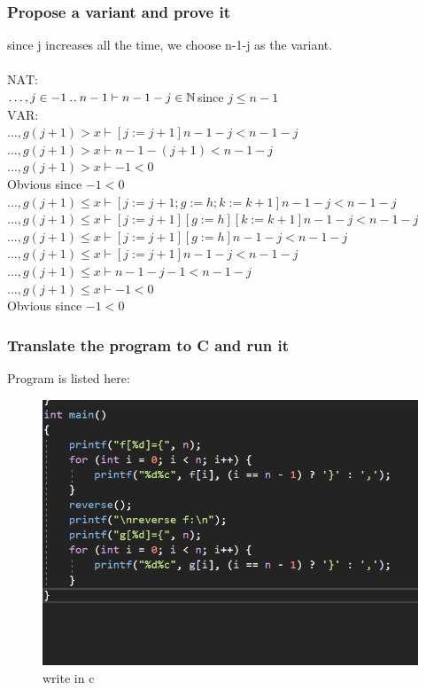 \documentclass[11pt,a4paper,fleqn]{article}
\begin{document}
\subsubsection{Propose a variant and prove it}
\noindent
since j increases all the time, we choose n-1-j as the variant.\\ 
\\
$\text{NAT:}$\\
$ \ldots,j\in -1\mathbin{.\mkern1mu.} n-1\vdash n-1-j\in \mathbb{N}$\quad since $j\leq n-1$\\
$\text{VAR:}$\\
$ \ldots,g(j+1)>x\vdash[j:=j+1]n-1-j<n-1-j$\\
$ \ldots,g(j+1)>x\vdash n-1-(j+1)<n-1-j$\\
$ \ldots,g(j+1)>x\vdash -1<0$\\
Obvious since $-1<0$\\
$ \ldots,g(j+1)\leq x\vdash[j:=j+1;g:=h;k:=k+1]n-1-j<n-1-j$\\
$ \ldots,g(j+1)\leq x\vdash[j:=j+1][g:=h][k:=k+1]n-1-j<n-1-j$\\
$ \ldots,g(j+1)\leq x\vdash[j:=j+1][g:=h]n-1-j<n-1-j$\\
$ \ldots,g(j+1)\leq x\vdash[j:=j+1]n-1-j<n-1-j$\\
$ \ldots,g(j+1)\leq x\vdash n-1-j-1<n-1-j$\\
$ \ldots,g(j+1)\leq x\vdash -1<0$\\
Obvious since $-1<0$\\

\subsubsection{Translate the program to C and run it}
Program is listed here:\\

\begin{figure}[h!]
\centering
\includegraphics{2.png}
\caption{ write in c}
\label{fig}
\end{figure}
\end{document}
